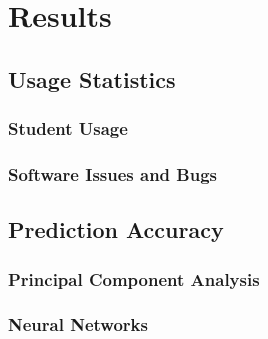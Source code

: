 \section{Results}

\subsection{Usage Statistics}
\subsubsection{Student Usage}
\subsubsection{Software Issues and Bugs}

\subsection{Prediction Accuracy}
\subsubsection{Principal Component Analysis}
\subsubsection{Neural Networks}

